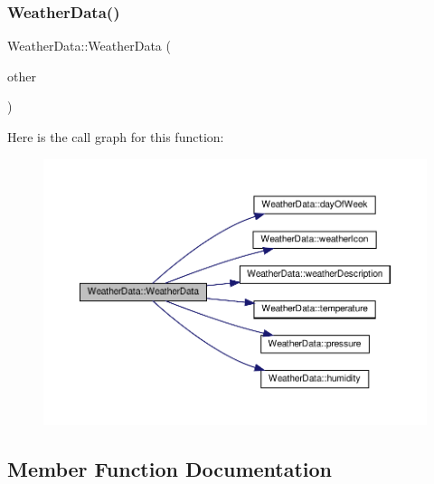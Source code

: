 \mbox{\label{class_weather_data_a48baeaa6b2a77d2a5e008159188416e8}} 
\subsubsection{\texorpdfstring{Weather\+Data()}{WeatherData()}\hspace{0.1cm}{\footnotesize\ttfamily [2/2]}}
{\footnotesize\ttfamily Weather\+Data\+::\+Weather\+Data (\begin{DoxyParamCaption}\item[{const \hyperlink{class_weather_data}{Weather\+Data} \&}]{other }\end{DoxyParamCaption})}

Here is the call graph for this function\+:
\nopagebreak
\begin{figure}[H]
\begin{center}
\leavevmode
\includegraphics[width=350pt]{class_weather_data_a48baeaa6b2a77d2a5e008159188416e8_cgraph}
\end{center}
\end{figure}


\subsection{Member Function Documentation}
\mbox{\label{class_weather_data_a23185106cf22ef8c57c96154e37b24d1}} 
